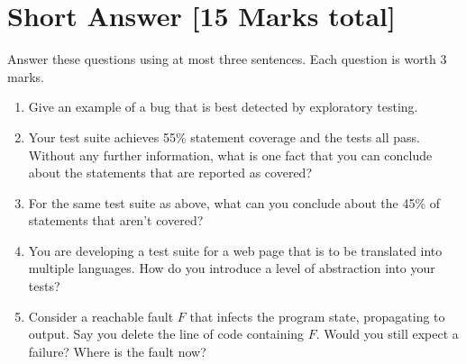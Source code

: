 \documentclass[12pt]{article}
\begin{document}





\newpage
\section{Short Answer [15 Marks total]}

Answer these questions using at most three sentences. Each question is worth
3 marks.

\begin{enumerate}[label=(\alph*)]

\item Give an example of a bug that is best detected by exploratory testing.
  \vspace*{6em}
\item Your test suite achieves 55\% statement coverage and the tests all pass. Without any further information, what is one fact that you can conclude about the statements that are reported as covered?
  \vspace*{6em}
\item For the same test suite as above, what can you conclude about the 45\% of statements that aren't covered?
  \vspace*{6em}
\item You are developing a test suite for a web page that is to be translated into multiple languages. How do you introduce a level of abstraction into your tests?
  \vspace*{6em}
\item Consider a reachable fault $F$ that infects the program state, propagating to output. Say you delete the line of code containing $F$. Would you still expect a failure? Where is the fault now?
  \vspace*{6em}


\end{enumerate}
\end{document}
